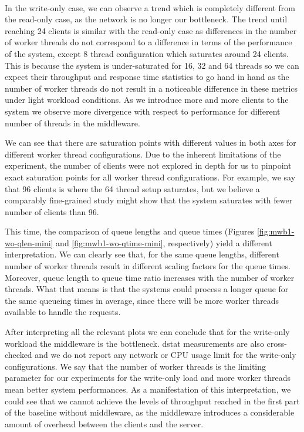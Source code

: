 \documentclass[11pt,a4paper]{article}
\begin{document}
\\
\par In the write-only case, we can observe a trend which is completely different from the read-only case, as the network is no longer our bottleneck. The trend until reaching 24 clients is similar with the read-only case as differences in the number of worker threads do not correspond to a difference in terms of the performance of the system, except 8 thread configuration which saturates around 24 clients. This is because the system is under-saturated for 16, 32 and 64 threads so we can expect their throughput and response time statistics to go hand in hand as the number of worker threads do not result in a noticeable difference in these metrics under light workload conditions. As we introduce more and more clients to the system we observe more divergence with respect to performance for different number of threads in the middleware.
\par We can see that there are saturation points with different values in both axes for different worker thread configurations. Due to the inherent limitations of the experiment, the number of clients were not explored in depth for us to pinpoint exact saturation points for all worker thread configurations. For example, we say that 96 clients is where the 64 thread setup saturates, but we believe a comparably fine-grained study might show that the system saturates with fewer number of clients than 96.
\par This time, the comparison of queue lengths and queue times (Figures \ref{fig:mwb1-wo-qlen-mini} and \ref{fig:mwb1-wo-qtime-mini}, respectively) yield a different interpretation. We can clearly see that, for the same queue lengths, different number of worker threads result in different scaling factors for the queue times. Moreover, queue length to queue time ratio increases with the number of worker threads. What that means is that the systems could process a longer queue for the same queueing times in average, since there will be more worker threads available to handle the requests.
\par After interpreting all the relevant plots we can conclude that for the write-only workload the middleware is the bottleneck. dstat measurements are also cross-checked and we do not report any network or CPU usage limit for the write-only configurations. We say that the number of worker threads is the limiting parameter for our experiments for the write-only load and more worker threads mean better system performances. As a manifestation of this interpretation, we could see that we cannot achieve the levels of throughput reached in the first part of the baseline without middleware, as the middleware introduces a considerable amount of overhead between the clients and the server.
\end{document}
